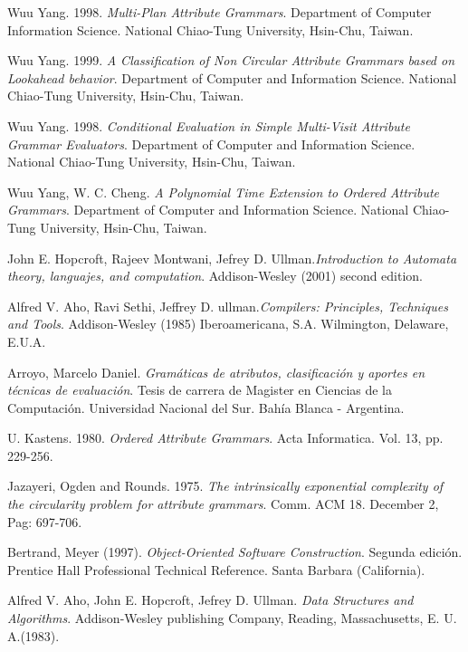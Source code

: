 \documentclass[runningheads,a4paper]{llncs}
\begin{document}

\begin{thebibliography}{10}

 Wuu Yang. 1998. \textit{Multi-Plan Attribute Grammars}. Department of Computer Information Science. National Chiao-Tung University, Hsin-Chu, Taiwan.

 Wuu Yang. 1999. \textit{A Classification of Non Circular Attribute Grammars based on Lookahead behavior}. Department of Computer and Information Science. National Chiao-Tung University, Hsin-Chu, Taiwan.

 Wuu Yang. 1998. \textit{Conditional Evaluation in Simple Multi-Visit Attribute Grammar Evaluators}. Department of Computer and Information Science. National
Chiao-Tung University, Hsin-Chu, Taiwan.

 Wuu Yang, W. C. Cheng. \emph{A Polynomial Time Extension to
Ordered Attribute Grammars}. Department of Computer and Information Science. 
National Chiao-Tung University, Hsin-Chu, Taiwan.


 John E. Hopcroft, Rajeev Montwani, Jefrey D. Ullman.\textit{Introduction to Automata theory, languajes, and computation}. Addison-Wesley (2001) second edition.

 Alfred V. Aho, Ravi Sethi, Jeffrey D. ullman.\textit{Compilers: Principles, Techniques and Tools}. Addison-Wesley (1985)  Iberoamericana, S.A. Wilmington, Delaware, E.U.A.

 Arroyo, Marcelo Daniel. \textit{Gramáticas de atributos, clasificación y aportes en técnicas de evaluación}. Tesis de carrera de Magister en Ciencias de la Computación. Universidad Nacional del Sur. Bahía Blanca - Argentina.

 U. Kastens. 1980. \textit{Ordered Attribute Grammars}. Acta Informatica. Vol. 13, pp. 229-256.

 Jazayeri, Ogden and Rounds. 1975. \emph{The intrinsically 
exponential complexity of the circularity problem for attribute grammars}. 
Comm. ACM 18. December 2, Pag: 697-706.

 Bertrand, Meyer (1997). \textit{Object-Oriented Software Construction}. Segunda edición. Prentice Hall Professional Technical Reference. Santa Barbara (California).

 Alfred V. Aho, John E. Hopcroft, Jefrey D. Ullman. \textit{Data Structures and Algorithms}. Addison-Wesley publishing Company, Reading, Massachusetts, E. U. A.(1983).


\end{thebibliography}
\end{document}
